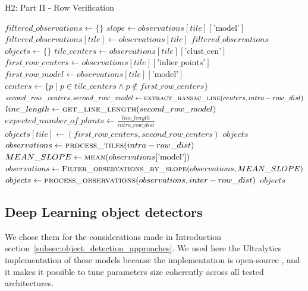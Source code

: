 \documentclass[12pt,a4paper,oneside]{report}
\begin{document}
  \begin{algorithm}
  \caption{H2: Part II - Row Verification}
  \label{alg:H2_part2}
  \begin{algorithmic}[1]
    \State $filtered\_observations \gets \{\}$
      \State $slope \gets observations[tile][\text{'model'}]$
        \State $filtered\_observations[tile] \gets observations[tile]$
      \EndIf
    \EndFor
    \State \Return $filtered\_observations$
  \EndFunction
    \State $objects \gets \{\}$
      \State $tile\_centers \gets observations[tile][\text{'clust\_cen'}]$
      \State $first\_row\_centers \gets observations[tile][\text{'inlier\_points'}]$
      \State $first\_row\_model \gets observations[tile][\text{'model'}]$
      \State $centers \gets \{p \mid p \in tile\_centers \land p \notin first\_row\_centers\}$
      \State $second\_row\_centers, second\_row\_model \gets \Call{extract\_ransac\_line}{centers, intra-row\_dist}$
      \State $line\_length \gets \Call{get\_line\_length}{second\_row\_model}$
      \State $expected\_number\_of\_plants \gets \frac{line\_length}{intra\_row\_dist}$
            \State $objects[tile] \gets (first\_row\_centers, second\_row\_centers)$
          \EndIf
        \EndIf
      \EndIf
    \EndFor
    \State \Return $objects$
  \EndFunction
    \State $observations \gets \Call{process\_tiles}{intra-row\_dist}$
    \State $MEAN\_SLOPE \gets \Call{mean}{observations[\text{'model'}]}$
    \State $observations \gets \Call{Filter\_observations\_by\_slope}{observations,MEAN\_SLOPE}$
    \State $objects \gets \Call{process\_observations}{observations,inter-row\_dist}$
    \State \Return $objects$
  \EndFunction
  \end{algorithmic}
  \end{algorithm}
\endgroup

\subsection{Deep Learning object detectors}

We chose them for the considerations made in Introduction section~\ref{subsec:object_detection_approaches}.
We used here the Ultralytics implementation of these models because the implementation is open-source \cite{jocherGitHubUltralyticsYOLO2023},
and it makes it possible to tune parameters size coherently across all tested architectures.
\end{document}
